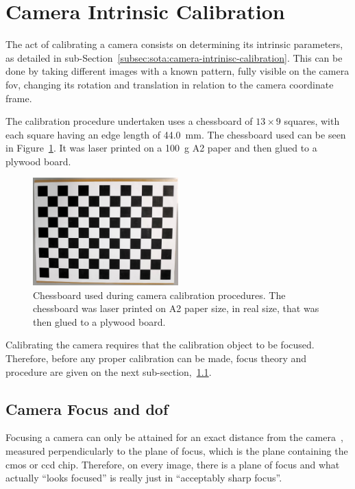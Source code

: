 \section{Camera Intrinsic Calibration}
\label{sec:calibration:camera}
The act of calibrating a camera consists on determining its intrinsic parameters, as detailed in sub-Section~\ref{subsec:sota:camera-intrinisc-calibration}. This can be done by taking different images with a known pattern, fully visible on the camera \ac{fov}, changing its rotation and translation in relation to the camera coordinate frame.

The calibration procedure undertaken uses a chessboard of $13 \times 9$ squares, with each square having an edge length of \SI{44.0}{\milli\meter}. The chessboard used can be seen in Figure~\ref{fig:chessboard}. It was laser printed on a \SI{100}{\gram} A2 paper and then glued to a plywood board.

\begin{figure}[!ht]
	\centering
	\includegraphics[width=0.5\textwidth]{img/experimental-setup/chessboard.jpg}
	\caption[Chessboard used for the camera calibration procedures.]{Chessboard used during camera calibration procedures. The chessboard was laser printed on A2 paper size, in real size, that was then glued to a plywood board.}
	\label{fig:chessboard}
\end{figure}

Calibrating the camera requires that the calibration object to be focused. Therefore, before any proper calibration can be made, focus theory and procedure are given on the next sub-section,~\ref{subsec:calibration:camera-focus}.


\subsection{Camera Focus and \acl{dof}}
\label{subsec:calibration:camera-focus}
Focusing a camera can only be attained for an exact distance from the camera~\cite{Merklinger1993, Photopillers}, measured perpendicularly to the plane of focus, which is the plane containing the \ac{cmos} or \ac{ccd} chip. Therefore, on every image, there is a plane of focus and what actually ``looks focused'' is really just in ``acceptably sharp focus''.

